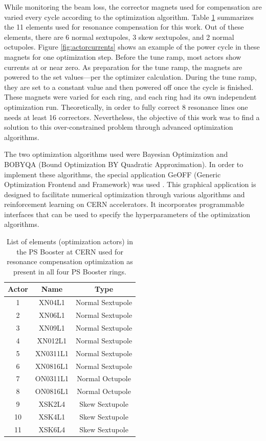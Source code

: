 While monitoring the beam loss, the corrector magnets used for compensation are varied every cycle according to the optimization algorithm. Table \ref{tab:psbcomp} summarizes the 11 elements used for resonance compensation for this work. Out of these elements, there are 6 normal sextupoles, 3 skew sextupoles, and 2 normal octupoles. Figure \ref{fig:actorcurrents} shows an example of the power cycle in these magnets for one optimization step. Before the tune ramp, most actors show currents at or near zero. As preparation for the tune ramp, the magnets are powered to the set values---per the optimizer calculation. During the tune ramp, they are set to a constant value and then powered off once the cycle is finished. These magnets were varied for each ring, and each ring had its own independent optimization run. Theoretically, in order to fully correct 8 resonance lines one needs at least 16 correctors. Nevertheless, the objective of this work was to find a solution to this over-constrained problem through advanced optimization algorithms. 

The two optimization algorithms used were Bayesian Optimization and BOBYQA (Bound Optimization BY Quadratic Approximation). In order to implement these algorithms, the special application GeOFF (Generic Optimization Frontend and Framework) was used \cite{geoff}. This graphical application is designed to facilitate numerical optimization through various algorithms and reinforcement learning on CERN accelerators. It incorporates programmable interfaces that can be used to specify the hyperparameters of the optimization algorithms.  

\begin{table}[H]
    \centering
    \caption{List of elements (optimization actors) in the PS Booster at CERN used for resonance compensation optimization as present in all four PS Booster rings.}
    \label{tab:psbcomp}
    \begin{tabular}{|c|c|c|}
    \hline
    \textbf{Actor} & \textbf{Name} & \textbf{Type}    \\ \hline
    1 & XN04L1    & Normal Sextupole \\ \hline
    2 & XN06L1    & Normal Sextupole \\ \hline
    3 & XN09L1    & Normal Sextupole \\ \hline
    4 & XN012L1    & Normal Sextupole \\ \hline
    5 & XN0311L1    & Normal Sextupole   \\ \hline
    6 & XN0816L1    & Normal Sextupole   \\ \hline
    7 & ON0311L1    & Normal Octupole  \\ \hline
    8 & ON0816L1    & Normal Octupole   \\ \hline
    9 & XSK2L4    & Skew Sextupole  \\ \hline
    10 & XSK4L1    & Skew Sextupole   \\ \hline
    11 & XSK6L4    & Skew Sextupole   \\ \hline
    \end{tabular}
\end{table}

